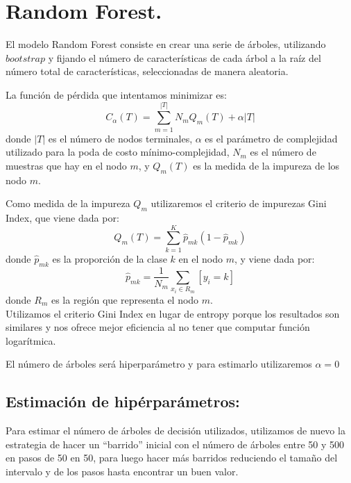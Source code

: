 \documentclass[11pt,a4paper]{article}
\theoremstyle{definition}
\begin{document}
	\section{Random Forest.}
	El modelo Random Forest consiste en crear una serie de árboles, utilizando $\textit{bootstrap}$ y fijando el número de características de cada árbol a la raíz del número total de características, seleccionadas de manera aleatoria.
	
	La función de pérdida que intentamos minimizar es:
	$$C_{\alpha}(T) = \sum_{m=1}^{|T|} N_{m} Q_{m}(T) + \alpha |T|$$
	donde $|T|$ es el número de nodos terminales, $\alpha$ es el parámetro de complejidad utilizado para la poda de costo mínimo-complejidad, $N_{m}$ es el número de muestras que hay en el nodo $m$, y $Q_{m}(T)$ es la medida de la impureza de los nodo $m$.
	
	Como medida de la impureza $Q_{m}$ utilizaremos el criterio de impurezas Gini Index, que viene dada por:
	$$Q_{m}(T) = \sum_{k=1}^{K} \hat{p}_{mk} (1 - \hat{p}_{mk})$$
	donde $\hat{p}_{mk}$ es la proporción de la clase $k$ en el nodo $m$, y viene dada por:
	$$\hat{p}_{mk} = \frac{1}{N_{m}} \sum_{x_{i} \in R_{m}} [y_{i} = k]$$
	donde $R_{m}$ es la región que representa el nodo $m$. \\
	Utilizamos el criterio Gini Index en lugar de entropy porque los resultados son similares y nos ofrece mejor eficiencia al no tener que computar función logarítmica.
	
	El número de árboles será hiperparámetro y para estimarlo utilizaremos $\alpha =0$
	
	\subsection{Estimación de hipérparámetros:}
	
	Para estimar el número de árboles de decisión utilizados, utilizamos de nuevo la estrategia de hacer un ``barrido'' inicial con el número de árboles entre 50 y 500 en pasos de 50 en 50, para luego hacer más barridos reduciendo el tamaño del intervalo y de los pasos hasta encontrar un buen valor.
	
\end{document}
